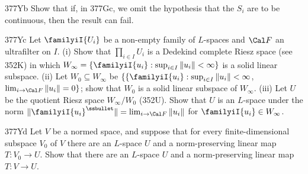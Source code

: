 {\spheader 377Yb Show that if, in 377Gc, we omit the hypothesis that the
$S_i$ are to be continuous, then the result can fail.

\spheader 377Yc Let $\familyiI{U_i}$ be a non-empty family of $L$-spaces
and $\Cal F$ an ultrafilter on $I$.   (i) Show that $\prod_{i\in I}U_i$ is a
Dedekind complete Riesz space (see 352K) in which
$W_{\infty}=\{\familyiI{u_i}:\sup_{i\in I}\|u_i\|<\infty\}$ is a solid
linear subspace.   (ii) Let $W_0\subseteq W_{\infty}$ be
$\{\{\familyiI{u_i}:\sup_{i\in I}\|u_i\|<\infty$,
$\lim_{i\to\Cal F}\|u_i\|=0\}$;  show that $W_0$ is a solid linear subspace
of $W_{\infty}$.   (iii) Let $U$ be the quotient Riesz space
$W_{\infty}/W_0$ (352U).   Show that $U$ is an $L$-space under the norm
$\|\familyiI{u_i}^{\ssbullet}\|=\lim_{i\to\Cal F}\|u_i\|$ for
$\familyiI{u_i}\in W_{\infty}$.

\spheader 377Yd Let $V$ be a normed space, and suppose that for every
finite-dimensional subspace $V_0$ of $V$ there are an $L$-space $U$ and a
norm-preserving linear map $T:V_0\to U$.   Show that there are an $L$-space
$U$ and a norm-preserving linear map $T:V\to U$.
}%


